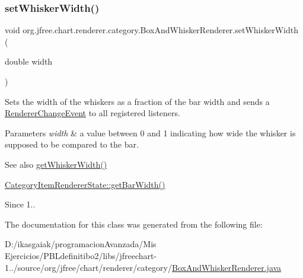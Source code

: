 \subsubsection{\texorpdfstring{set\+Whisker\+Width()}{setWhiskerWidth()}}
{\footnotesize\ttfamily void org.\+jfree.\+chart.\+renderer.\+category.\+Box\+And\+Whisker\+Renderer.\+set\+Whisker\+Width (\begin{DoxyParamCaption}\item[{double}]{width }\end{DoxyParamCaption})}

Sets the width of the whiskers as a fraction of the bar width and sends a \mbox{\hyperlink{}{Renderer\+Change\+Event}} to all registered listeners.


\begin{DoxyParams}{Parameters}
{\em width} & a value between 0 and 1 indicating how wide the whisker is supposed to be compared to the bar. \\
\hline
\end{DoxyParams}
\begin{DoxySeeAlso}{See also}
\mbox{\hyperlink{classorg_1_1jfree_1_1chart_1_1renderer_1_1category_1_1_box_and_whisker_renderer_a78cc4192959c2c432656a3293aa8f3ac}{get\+Whisker\+Width()}} 

\mbox{\hyperlink{classorg_1_1jfree_1_1chart_1_1renderer_1_1category_1_1_category_item_renderer_state_a8c9ac59a1be97bd9528e30cee6d60f09}{Category\+Item\+Renderer\+State\+::get\+Bar\+Width()}}
\end{DoxySeeAlso}
\begin{DoxySince}{Since}
1.. 
\end{DoxySince}


The documentation for this class was generated from the following file\+:\begin{DoxyCompactItemize}
\item 
D\+:/ikasgaiak/programacion\+Avanzada/\+Mis Ejercicios/\+P\+B\+Ldefinitibo2/libs/jfreechart-\/1../source/org/jfree/chart/renderer/category/\mbox{\hyperlink{_box_and_whisker_renderer_8java}{Box\+And\+Whisker\+Renderer.\+java}}\end{DoxyCompactItemize}
